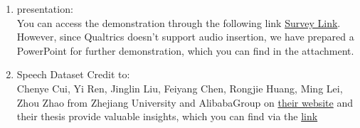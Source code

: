 \documentclass{../labbook}
\begin{document}
\begin{solution}
\begin{enumerate}
    \item presentation: \\ You can access the demonstration through the following link \href{https://rug.eu.qualtrics.com/jfe/form/SV_0BtqBuja5LqE2vc}{Survey Link}. However, since Qualtrics doesn't support audio insertion, we have prepared a PowerPoint for further demonstration, which you can find in the attachment.
    \item Speech Dataset Credit to: \\ Chenye Cui, Yi Ren, Jinglin Liu, Feiyang Chen, Rongjie Huang, Ming Lei, Zhou Zhao from Zhejiang University and AlibabaGroup on \href{https://viem-ccy.github.io/EMOVIE/}{their website} and their thesis provide valuable insights, which you can find via the \href{https://arxiv.org/pdf/2106.09317.pdf}{link}

\end{enumerate}
\end{solution}
\end{document}
